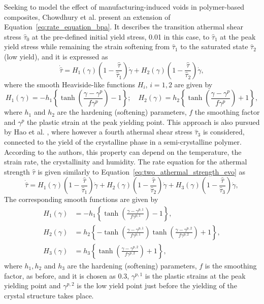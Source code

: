 Seeking to model the effect of manufacturing-induced voids in polymer-based composites, Chowdhury et al. \citep{chowdhuryEffectsManufacturingInducedVoids2008} present an extension of Equation~\eqref{eq:rate_equation_bpa}.
It describes the transition  athermal shear stress $\hat\tau_0$ at the pre-defined initial yield stress, 0.01 in this case, to $\hat\tau_1$ at the peak yield stress while remaining the strain softening from $\hat\tau_1$ to the saturated state $\hat\tau_2$ (low yield), and it is expressed as
\begin{equation}
	\label{eq:two_athermal_strength_evo}
	\dot{\hat\tau}=H_1(\gamma)\left(1-\frac{\hat\tau}{\hat\tau_1}\right) \dot{\gamma}+H_2(\gamma)\left(1-\frac{\hat\tau}{\hat\tau_2}\right)\dot{\gamma},
\end{equation}
where the smooth Heaviside-like functions $H_i$, $i=1,2$ are given by
\begin{equation}
	H_1(\gamma)=-h_1\left\{\tanh \left(\frac{\gamma-\gamma^p}{f \gamma^p}\right)-1\right\} ; \quad H_2(\gamma)=h_2\left\{\tanh \left(\frac{\gamma-\gamma^p}{f \gamma^p}\right)+1\right\},
\end{equation}
where $h_1$ and $h_2$ are the hardening (softening) parameters, $f$ the smoothing factor and $\gamma^p$ the plastic strain at the peak yielding point.
This approach is also pursued by Hao et al. \citep{haoUnifiedAmorphousCrystalline2022}, where however a fourth athermal shear stress $\hat \tau_3$ is considered, connected to the yield of the crystalline phase in a semi-crystalline polymer.
According to the authors, this property can depend on the temperature, the strain rate, the crystallinity and humidity.
The rate equation for the athermal strength $\hat\tau$ is given similarly to Equation~\eqref{eq:two_athermal_strength_evo} as
\begin{equation}
	\dot{\hat\tau}=H_1(\gamma) \left(1-\frac{\hat\tau}{\hat\tau_1}\right)  \dot{\gamma}+H_2(\gamma) \left(1-\frac{\hat\tau}{\hat\tau_2}\right)  \dot{\gamma}+H_3(\gamma) \left(1-\frac{\hat\tau}{\hat\tau_3}\right)  \dot{\gamma},
\end{equation}
The corresponding smooth functions are given by
\begin{align}
	H_1(\gamma)&=-h_1\left\{\tanh \left(\frac{\gamma-\gamma^{p,1}}{f \gamma^{p,1}}\right)-1\right\}, \\
	H_2(\gamma)&=h_2\left\{-\tanh \left(\frac{\gamma-\gamma^{p,1}}{f \gamma^{p,1}}\right) \tanh \left(\frac{\gamma-\gamma^{p,2}}{f \gamma^{p,2}}\right)+1\right\}, \\
	H_3(\gamma)&=h_3\left\{\tanh \left(\frac{\gamma-\gamma^{p,2}}{f \gamma^{p,2}}\right)+1\right\},
\end{align}
where $h_1, h_2$ and $h_3$ are the hardening (softening) parameters, $f$ is the smoothing factor, as before, and it is chosen as $0.3$, $\gamma^{p,1}$ is the plastic strains at the peak yielding point and $\gamma^{p,2}$ is the low yield point just before the yielding of the crystal structure takes place.

